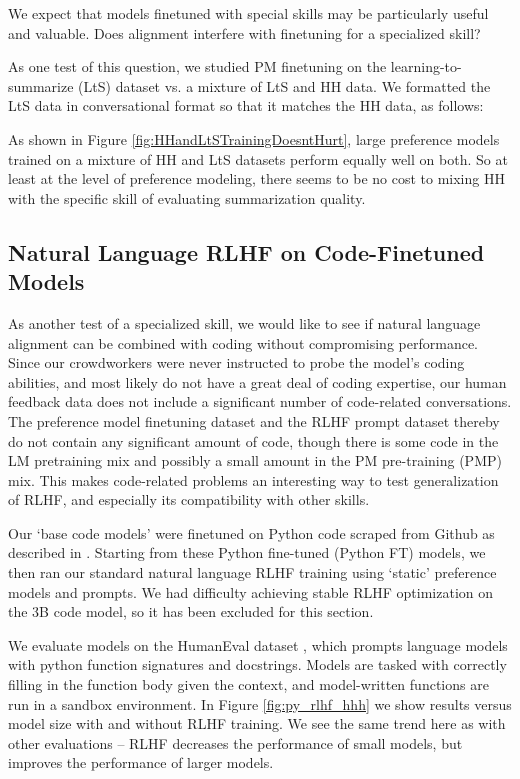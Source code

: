 We expect that models finetuned with special skills may be particularly useful and valuable.  Does alignment interfere with finetuning for a specialized skill?  

As one test of this question, we studied PM finetuning on the learning-to-summarize (LtS) \cite{stiennon2020learning} dataset vs. a mixture of LtS and HH data.  We formatted the LtS data in conversational format so that it matches the HH data, as follows:

As shown in Figure \ref{fig:HHandLtSTrainingDoesntHurt}, large preference models trained on a mixture of HH and LtS datasets perform equally well on both. So at least at the level of preference modeling, there seems to be no cost to mixing HH with the specific skill of evaluating summarization quality.

\subsection{Natural Language RLHF on Code-Finetuned Models}
\label{sec:RLHFCodeModel}

As another test of a specialized skill, we would like to see if natural language alignment can be combined with coding without compromising performance. Since our crowdworkers were never instructed to probe the model's coding abilities, and most likely do not have a great deal of coding expertise, our human feedback data does not include a significant number of code-related conversations. The preference model finetuning dataset and the RLHF prompt dataset thereby do not contain any significant amount of code, though there is some code in the LM pretraining mix and possibly a small amount in the PM pre-training (PMP) mix. This makes code-related problems an interesting way to test generalization of RLHF, and especially its compatibility with other skills.  

Our `base code models' were finetuned on Python code scraped from Github as described in \cite{askell2021general}. Starting from these Python fine-tuned (Python FT) models, we then ran our standard natural language RLHF training using `static' preference models and prompts.  We had difficulty achieving stable RLHF optimization on the 3B code model, so it has been excluded for this section.

We evaluate models on the HumanEval dataset \cite{chen2021codex}, which prompts language models with python function signatures and docstrings. Models are tasked with correctly filling in the function body given the context, and  model-written functions are run in a sandbox environment.  In Figure \ref{fig:py_rlhf_hhh} we show results versus model size with and without RLHF training. We see the same trend here as with other evaluations -- RLHF decreases the performance of small models, but improves the performance of larger models.

